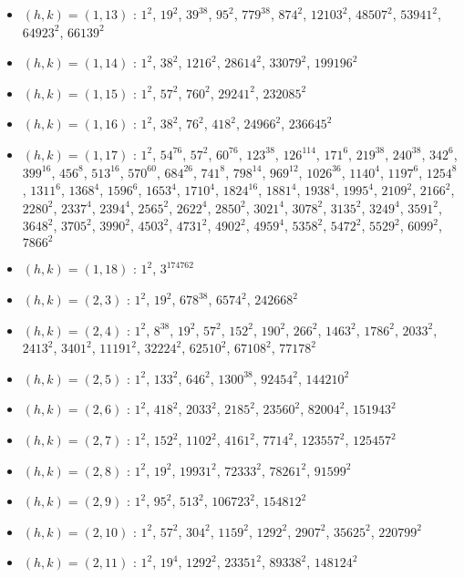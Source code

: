 \begin{itemize}
\item $(h,k)=(1,13)$ : $1^{2}$, $19^{2}$, $39^{38}$, $95^{2}$, $779^{38}$, $874^{2}$, $12103^{2}$, $48507^{2}$, $53941^{2}$, $64923^{2}$, $66139^{2}$
\item $(h,k)=(1,14)$ : $1^{2}$, $38^{2}$, $1216^{2}$, $28614^{2}$, $33079^{2}$, $199196^{2}$
\item $(h,k)=(1,15)$ : $1^{2}$, $57^{2}$, $760^{2}$, $29241^{2}$, $232085^{2}$
\item $(h,k)=(1,16)$ : $1^{2}$, $38^{2}$, $76^{2}$, $418^{2}$, $24966^{2}$, $236645^{2}$
\item $(h,k)=(1,17)$ : $1^{2}$, $54^{76}$, $57^{2}$, $60^{76}$, $123^{38}$, $126^{114}$, $171^{6}$, $219^{38}$, $240^{38}$, $342^{6}$, $399^{16}$, $456^{8}$, $513^{16}$, $570^{60}$, $684^{26}$, $741^{8}$, $798^{14}$, $969^{12}$, $1026^{36}$, $1140^{4}$, $1197^{6}$, $1254^{8}$, $1311^{6}$, $1368^{4}$, $1596^{6}$, $1653^{4}$, $1710^{4}$, $1824^{16}$, $1881^{4}$, $1938^{4}$, $1995^{4}$, $2109^{2}$, $2166^{2}$, $2280^{2}$, $2337^{4}$, $2394^{4}$, $2565^{2}$, $2622^{4}$, $2850^{2}$, $3021^{4}$, $3078^{2}$, $3135^{2}$, $3249^{4}$, $3591^{2}$, $3648^{2}$, $3705^{2}$, $3990^{2}$, $4503^{2}$, $4731^{2}$, $4902^{2}$, $4959^{4}$, $5358^{2}$, $5472^{2}$, $5529^{2}$, $6099^{2}$, $7866^{2}$
\item $(h,k)=(1,18)$ : $1^{2}$, $3^{174762}$
\item $(h,k)=(2,3)$ : $1^{2}$, $19^{2}$, $678^{38}$, $6574^{2}$, $242668^{2}$
\item $(h,k)=(2,4)$ : $1^{2}$, $8^{38}$, $19^{2}$, $57^{2}$, $152^{2}$, $190^{2}$, $266^{2}$, $1463^{2}$, $1786^{2}$, $2033^{2}$, $2413^{2}$, $3401^{2}$, $11191^{2}$, $32224^{2}$, $62510^{2}$, $67108^{2}$, $77178^{2}$
\item $(h,k)=(2,5)$ : $1^{2}$, $133^{2}$, $646^{2}$, $1300^{38}$, $92454^{2}$, $144210^{2}$
\item $(h,k)=(2,6)$ : $1^{2}$, $418^{2}$, $2033^{2}$, $2185^{2}$, $23560^{2}$, $82004^{2}$, $151943^{2}$
\item $(h,k)=(2,7)$ : $1^{2}$, $152^{2}$, $1102^{2}$, $4161^{2}$, $7714^{2}$, $123557^{2}$, $125457^{2}$
\item $(h,k)=(2,8)$ : $1^{2}$, $19^{2}$, $19931^{2}$, $72333^{2}$, $78261^{2}$, $91599^{2}$
\item $(h,k)=(2,9)$ : $1^{2}$, $95^{2}$, $513^{2}$, $106723^{2}$, $154812^{2}$
\item $(h,k)=(2,10)$ : $1^{2}$, $57^{2}$, $304^{2}$, $1159^{2}$, $1292^{2}$, $2907^{2}$, $35625^{2}$, $220799^{2}$
\item $(h,k)=(2,11)$ : $1^{2}$, $19^{4}$, $1292^{2}$, $23351^{2}$, $89338^{2}$, $148124^{2}$

\end{itemize}
